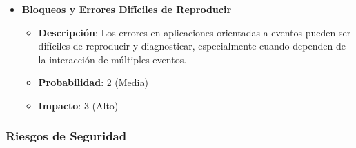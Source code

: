 \begin{itemize}
    \item \textbf{Bloqueos y Errores Difíciles de Reproducir}
          \begin{itemize}
              \item \textbf{Descripción}: Los errores en aplicaciones orientadas a eventos pueden ser difíciles de reproducir y diagnosticar, especialmente cuando dependen de la interacción de múltiples eventos.
              \item \textbf{Probabilidad}: 2 (Media)
              \item \textbf{Impacto}: 3 (Alto)
          \end{itemize}
\end{itemize}

\subsubsection{Riesgos de Seguridad}

